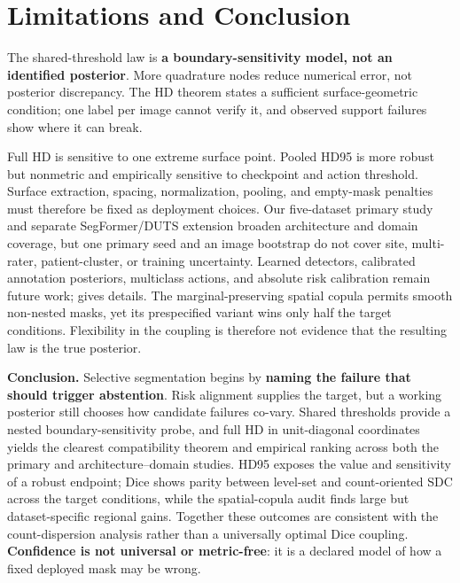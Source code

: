 \section{Limitations and Conclusion}
\label{sec:limitations}
\label{sec:limitations-conclusion}

The shared-threshold law is \textbf{a boundary-sensitivity model, not an identified posterior}.
More quadrature nodes reduce numerical error, not
posterior discrepancy. The HD theorem states a sufficient surface-geometric
condition; one label per image cannot verify it, and observed support failures
show where it can break.

Full HD is sensitive to one extreme surface point. Pooled HD95 is more robust
but nonmetric and empirically sensitive to checkpoint and action threshold.
Surface extraction, spacing, normalization, pooling, and empty-mask penalties
must therefore be fixed as deployment choices. Our five-dataset primary study
and separate SegFormer/DUTS extension broaden architecture and domain coverage,
but one primary seed and an image bootstrap do not cover site,
multi-rater, patient-cluster, or training uncertainty. Learned detectors,
calibrated annotation posteriors, multiclass actions, and absolute risk
calibration remain future work;  gives details.
The marginal-preserving spatial copula permits smooth non-nested masks, yet its
prespecified variant wins only half the target conditions. Flexibility in the
coupling is therefore not evidence that the resulting law is the true posterior.

\noindent\textbf{Conclusion.}
\label{sec:conclusion}
Selective segmentation begins by \textbf{naming the failure that should trigger
abstention}. Risk alignment supplies the target, but a working posterior still
chooses how candidate failures co-vary. Shared thresholds provide a nested
boundary-sensitivity probe, and full HD in unit-diagonal coordinates yields the
clearest compatibility theorem and empirical ranking across both the primary
and architecture--domain studies.
HD95 exposes the value and sensitivity of a robust endpoint;
Dice shows parity between level-set and count-oriented SDC across the target
conditions, while the spatial-copula audit finds large but dataset-specific
regional gains. Together these outcomes are consistent with the count-dispersion
analysis rather than a universally optimal Dice coupling.
\textbf{Confidence is not universal or metric-free}: it is a declared model of how a
fixed deployed mask may be wrong.
